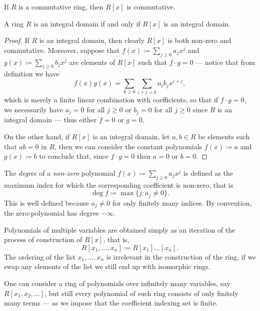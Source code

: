 %
\begin{corollary}
\label{cor:ring-R[x]-inherits-commutativity}
If \(R\) is a commutative ring, then \(R[x]\) is commutative.
\end{corollary}
%

%
\begin{lemma}
\label{lem:ring-R[x]-inherits-integral-domain}
A ring \(R\) is an integral domain if and only if \(R[x]\) is an integral
domain.
\end{lemma}
%

%
\begin{proof}
If \(R\) is an integral domain, then clearly \(R[x]\) is both non-zero and
commutative. Moreover, suppose that \(f(x) \coloneq \sum_{j \geq 0} a_j x^j\)
and \(g(x) \coloneq \sum_{j \geq 0} b_j x^j\) are elements of \(R[x]\) such that
\(f \cdot g = 0\) --- notice that from definition we have
\[
  f(x) g(x) = \sum_{k \geq 0} \sum_{i + j = k} a_i b_j x^{i + j},
\]
which is merely a finite linear combination with coefficients, so that if
\(f \cdot g = 0\), we necessarily have \(a_j = 0\) for all \(j \geq 0\) or
\(b_j = 0\) for all \(j \geq 0\) since \(R\) is an integral domain --- thus
either \(f = 0\) or \(g = 0\).

On the other hand, if \(R[x]\) is an integral domain, let \(a, b \in R\) be
elements such that \(a b = 0\) in \(R\), then we can consider the constant
polynomials \(f(x) \coloneq a\) and \(g(x) \coloneq b\) to conclude that, since
\(f \cdot g = 0\) then \(a = 0\) or \(b = 0\).
\end{proof}
%

%
\begin{definition}
\label{def:degree-polynomial}
The \emph{degree} of a \emph{non-zero} polynomial
\(f(x) \coloneq \sum_{j \geq 0} a_j x^j\) is defined as the maximum index for
which the corresponding coefficient is non-zero, that is
\[
  \deg f \coloneq \max \{j \colon a_j \neq 0\}.
\]
This is well defined because \(a_j \neq 0\) for only finitely many indices.
By convention, the zero-polynomial has degree \(-\infty\).
\end{definition}
%

Polynomials of multiple variables are obtained simply as an iteration of the
process of construction of \(R[x]\), that is,
\[
  R[x_1, \dots, x_n] \coloneq R[x_1] \dots [x_n].
\]
The ordering of the list \(x_1, \dots, x_n\) is irrelevant in the construction
of the ring, if we swap any elements of the list we still end up with isomorphic
rings.

One can consider a ring of polynomials over infinitely many variables, say
\(R[x_1, x_2, \dots]\), but still every polynomial of such ring consists of only
finitely many terms --- as we impose that the coefficient indexing set is
finite.

